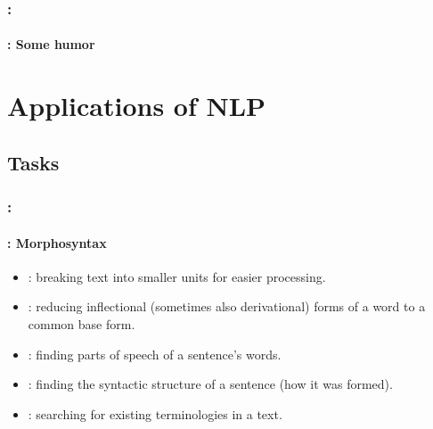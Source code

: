 \documentclass[xcolor=table]{beamer}
\begin{document}
\begin{frame}
	\frametitle{\insertshortsubtitle: \insertsection}
	\framesubtitle{\insertsubsection: Some humor}

	\begin{center}
	\end{center}

\end{frame}

\section{Applications of NLP}

\begin{frame}
	\frametitle{\insertshortsubtitle}
	\framesubtitle{\insertsection}
	
	
\end{frame}

\subsection{Tasks}

\begin{frame}
	\frametitle{\insertshortsubtitle: \insertsection}
	\framesubtitle{\insertsubsection: Morphosyntax}

	\begin{itemize}
		\item {}: breaking text into smaller units for easier processing.
		\item {}: reducing inflectional (sometimes also derivational) forms of a word to a common base form.
		\item {}: finding parts of speech of a sentence's words.
		\item {}: finding the syntactic structure of a sentence (how it was formed).
		\item {}: searching for existing terminologies in a text.
	\end{itemize}

\end{frame}
\end{document}

